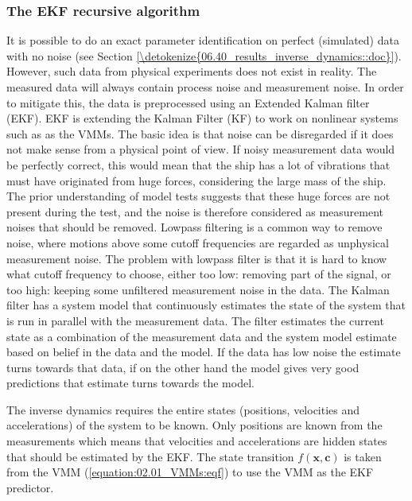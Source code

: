 \documentclass[review]{elsarticle}
\begin{document}
\subsubsection{The EKF recursive algorithm}
\label{\detokenize{04.01_EK:the-ekf-recursive-algorithm}}
\sphinxAtStartPar
It is possible to do an exact parameter identification on perfect (simulated) data with no noise (see Section \ref{\detokenize{06.40_results_inverse_dynamics::doc}}). However, such data from physical experiments does not exist in reality. The measured data will always contain process noise and measurement noise. In order to mitigate this, the data is pre\sphinxhyphen{}processed using an Extended Kalman filter (EKF). EKF  is extending the Kalman Filter (KF) to work on nonlinear systems such as as the VMMs. The basic idea is that noise can be disregarded if it does not make sense from a physical point of view. If noisy measurement data would be perfectly correct, this would mean that the ship has a lot of vibrations that must have originated from huge forces, considering the large mass of the ship. The prior understanding of model tests suggests that these huge forces are not present during the test, and the noise is therefore considered as measurement noises that should be removed. Low\sphinxhyphen{}pass filtering is a common way to remove noise, where motions above some cut\sphinxhyphen{}off frequencies are regarded as unphysical measurement noise. The problem with low\sphinxhyphen{}pass filter is that it is hard to know what cut\sphinxhyphen{}off frequency to choose, either too low: removing part of the signal, or too high: keeping some unfiltered measurement noise in the data. The Kalman filter has a system model that continuously estimates the state of the system that is run in parallel with the measurement data. The filter estimates the current state as a combination of the measurement data and the system model estimate based on belief in the data and the model. If the data has low noise the estimate turns towards that data, if on the other hand the model gives very good predictions that estimate turns towards the model.

\sphinxAtStartPar
The inverse dynamics requires the entire states (positions, velocities and accelerations) of the system to be known. Only positions are known from the measurements which means that velocities and accelerations are hidden states that should be estimated by the EKF.
The state transition \(f(\mathbf{x},\mathbf{c})\) is taken from the VMM (\autoref{equation:02.01_VMMs:eqf}) to use the VMM as the EKF predictor.
\end{document}
